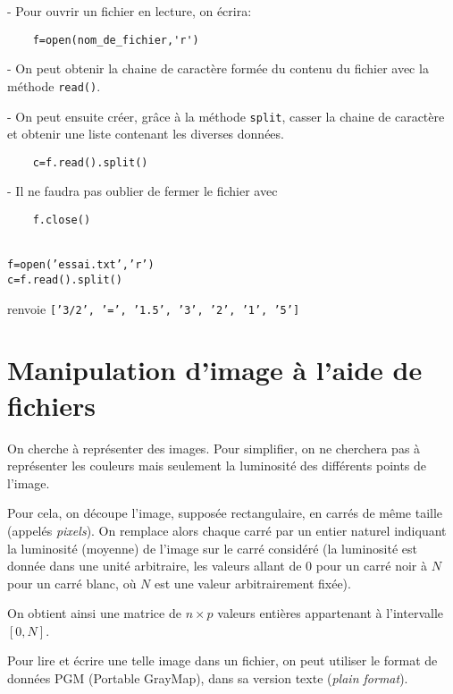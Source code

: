 - Pour ouvrir un fichier en lecture, on écrira:

\begin{lstlisting}
	f=open(nom_de_fichier,'r')
\end{lstlisting}

- On peut obtenir la chaine de caractère formée du contenu du fichier avec la méthode \texttt{read()}.

- On peut ensuite créer, grâce à la méthode \texttt{split}, casser la chaine de caractère et obtenir une liste contenant les diverses données.

\begin{lstlisting}
	c=f.read().split()
\end{lstlisting}

- Il ne faudra pas oublier de fermer le fichier avec 

\begin{lstlisting}
	f.close()
\end{lstlisting}

\begin{exemple}
	\ \\[1mm]
	\texttt{f=open('essai.txt','r')}	\\
	\texttt{c=f.read().split()}
\end{exemple}

renvoie \texttt{['3/2', '=', '1.5', '3', '2', '1', '5']}


\section*{Manipulation d'image à l'aide de fichiers}
	
	On cherche à représenter des  images. Pour simplifier, on ne cherchera
pas  à  représenter les  couleurs  mais  seulement  la luminosité  des
différents points de l'image.  

\medskip Pour cela, on découpe l'image, supposée
rectangulaire,  en carrés  de même  taille (appelés \emph{pixels}). On
remplace  alors chaque
carré  par un  entier  naturel indiquant  la  luminosité (moyenne)  de
l'image sur le carré considéré (la luminosité est donnée dans une
unité arbitraire, les valeurs allant de $0$ pour un carré noir à $N$
pour un carré blanc, où $N$ est une valeur arbitrairement fixée). 

On
obtient ainsi une matrice de $n\times p$ valeurs entières appartenant
à l'intervalle $[0, N]$.

\bigskip Pour lire et écrire une telle image dans un fichier, on peut utiliser
le format de données PGM (Portable GrayMap), dans sa version texte
(\textit{plain format}).

